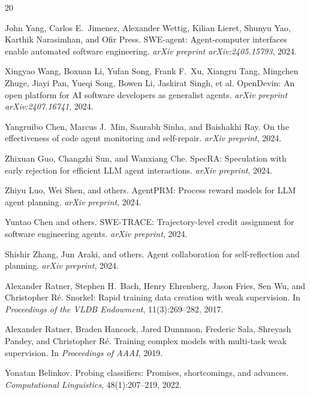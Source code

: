 \documentclass[11pt,a4paper]{article}
\begin{document}
\begin{thebibliography}{20}

John Yang, Carlos E.\ Jimenez, Alexander Wettig, Kilian Lieret, Shunyu Yao, Karthik Narasimhan, and Ofir Press.
\newblock SWE-agent: Agent-computer interfaces enable automated software engineering.
\newblock \emph{arXiv preprint arXiv:2405.15793}, 2024.

Xingyao Wang, Boxuan Li, Yufan Song, Frank F.\ Xu, Xiangru Tang, Mingchen Zhuge, Jiayi Pan, Yueqi Song, Bowen Li, Jaskirat Singh, et al.
\newblock OpenDevin: An open platform for AI software developers as generalist agents.
\newblock \emph{arXiv preprint arXiv:2407.16741}, 2024.

Yangruibo Chen, Marcus J.\ Min, Saurabh Sinha, and Baishakhi Ray.
\newblock On the effectiveness of code agent monitoring and self-repair.
\newblock \emph{arXiv preprint}, 2024.

Zhixuan Guo, Changzhi Sun, and Wanxiang Che.
\newblock SpecRA: Speculation with early rejection for efficient LLM agent interactions.
\newblock \emph{arXiv preprint}, 2024.

Zhiyu Luo, Wei Shen, and others.
\newblock AgentPRM: Process reward models for LLM agent planning.
\newblock \emph{arXiv preprint}, 2024.

Yuntao Chen and others.
\newblock SWE-TRACE: Trajectory-level credit assignment for software engineering agents.
\newblock \emph{arXiv preprint}, 2024.

Shishir Zhang, Jun Araki, and others.
\newblock Agent collaboration for self-reflection and planning.
\newblock \emph{arXiv preprint}, 2024.

Alexander Ratner, Stephen H.\ Bach, Henry Ehrenberg, Jason Fries, Sen Wu, and Christopher R{\'e}.
\newblock Snorkel: Rapid training data creation with weak supervision.
\newblock In \emph{Proceedings of the VLDB Endowment}, 11(3):269--282, 2017.

Alexander Ratner, Braden Hancock, Jared Dunnmon, Frederic Sala, Shreyash Pandey, and Christopher R{\'e}.
\newblock Training complex models with multi-task weak supervision.
\newblock In \emph{Proceedings of AAAI}, 2019.

Yonatan Belinkov.
\newblock Probing classifiers: Promises, shortcomings, and advances.
\newblock \emph{Computational Linguistics}, 48(1):207--219, 2022.

\end{thebibliography}
\end{document}
